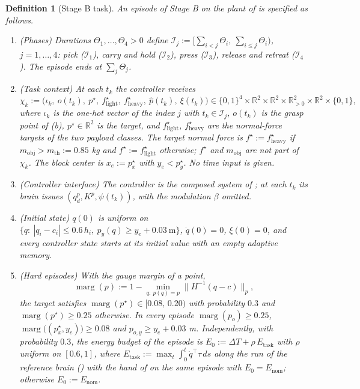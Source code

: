 \documentclass[11pt]{article}\usepackage[margin=1in]{geometry}\usepackage{amsmath,amssymb,amsthm,mathtools}\usepackage{graphicx}\graphicspath{{figures/}{../figures/}{figs/}{./}}\usepackage{enumitem}\usepackage{hyperref}\usepackage{cleveref}\usepackage{tikz}\usetikzlibrary{arrows.meta,positioning,calc,shapes.geometric}\usepackage{float}\usepackage{rotating}\usepackage[most]{tcolorbox}\usepackage{kotex}\usepackage{booktabs}\usepackage{longtable}\emergencystretch=1.6em\tolerance=2000 \crefname{assumption}{Assumption}{Assumptions}\Crefname{assumption}{Assumption}{Assumptions}\crefname{definition}{Definition}{Definitions}\Crefname{definition}{Definition}{Definitions}\crefname{proposition}{Proposition}{Propositions}\Crefname{proposition}{Proposition}{Propositions}\crefname{fact}{Fact}{Facts}\Crefname{fact}{Fact}{Facts} \newtheorem{assumption}{Assumption}\newtheorem{definition}{Definition}\newtheorem{lemma}{Lemma}\newtheorem{proposition}{Proposition}\newtheorem{theorem}{Theorem}\newtheorem{corollary}{Corollary}\newtheorem{fact}{Fact}\theoremstyle{remark}\newtheorem{remark}{Remark} \newcommand{\R}{\mathbb{R}}\newcommand{\xb}{\bar x}\newcommand{\Ab}{\bar A}\newcommand{\By}{\bar B_y}\newcommand{\U}{\mathcal U}\newcommand{\Z}{\mathcal Z}
\begin{document}
\begin{definition}[Stage B task]
\label{def:stageBtask}
An episode of Stage B on the plant of  is specified as follows.
\begin{enumerate}[label=(\alph*), start=6]
\item (Phases) Durations $\Theta_1,\dots,\Theta_4>0$ define $\mathcal I_j:=\big[\sum_{i<j}\Theta_i,\ \sum_{i\le j}\Theta_i\big)$, $j=1,\dots,4$: pick ($\mathcal I_1$), carry and hold ($\mathcal I_2$), press ($\mathcal I_3$), release and retreat ($\mathcal I_4$). The episode ends at $\sum_{j}\Theta_j$.
\item (Task context) At each $t_k$ the controller receives
\[
\chi_k:=\big(\iota_k,\ o(t_k),\ p^\star,\ f^\star_{\mathrm{light}},\ f^\star_{\mathrm{heavy}},\ \hat p(t_k),\ \xi(t_k)\big)\in\{0,1\}^4\times\R^2\times\R^2\times\R_{>0}^2\times\R^2\times\{0,1\},
\]
where $\iota_k$ is the one-hot vector of the index $j$ with $t_k\in\mathcal I_j$, $o(t_k)$ is the grasp point of (b), $p^\star\in\R^2$ is the target, and $f^\star_{\mathrm{light}}$, $f^\star_{\mathrm{heavy}}$ are the normal-force targets of the two payload classes. The target normal force is $f^\star:=f^\star_{\mathrm{heavy}}$ if $m_{\mathrm{obj}}>m_{\mathrm{th}}:=0.85$ kg and $f^\star:=f^\star_{\mathrm{light}}$ otherwise; $f^\star$ and $m_{\mathrm{obj}}$ are not part of $\chi_k$. The block center is $x_e:=p^\star_x$ with $y_e<p^\star_y$. No time input is given.
\item (Controller interface) The controller is the composed system of ; at each $t_k$ its brain issues $(q_d^p,K^p,\psi(t_k))$, with the modulation $\beta$ omitted.
\item (Initial state) $q(0)$ is uniform on $\{q:\ |q_i-c_i|\le0.6\,h_i,\ p_y(q)\ge y_e+0.03\ \mathrm m\}$, $\dot q(0)=0$, $\xi(0)=0$, and every controller state starts at its initial value with an empty adaptive memory.
\item (Hard episodes) With the gauge margin of a point,
\[
\operatorname{marg}(p):=1-\min_{q:\ p(q)=p}\big\|H^{-1}(q-c)\big\|_p ,
\]
the target satisfies $\operatorname{marg}(p^\star)\in[0.08,\,0.20)$ with probability $0.3$ and $\operatorname{marg}(p^\star)\ge0.25$ otherwise. In every episode $\operatorname{marg}(p_o)\ge0.25$, $\operatorname{marg}\big((p^\star_x,y_e)\big)\ge0.08$ and $p_{o,y}\ge y_e+0.03$ m. Independently, with probability $0.3$, the energy budget of the episode is $E_0:=\Delta T+\rho\,E_{\mathrm{task}}$ with $\rho$ uniform on $[0.6,1]$, where $E_{\mathrm{task}}:=\max_t\int_0^t\dot q^\top\tau\,ds$ along the run of the reference brain () with the hand of  on the same episode with $E_0=E_{\mathrm{nom}}$; otherwise $E_0:=E_{\mathrm{nom}}$.

\end{enumerate}
\end{definition}
\end{document}
